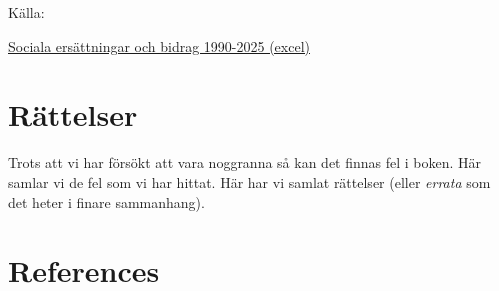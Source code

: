 \documentclass[
  letterpaper,
  DIV=11,
  numbers=noendperiod]{scrreprt}
\begin{document}
Källa:

\href{https://www.scb.se/hitta-statistik/statistik-efter-amne/hushallens-ekonomi/hushallens-inkomster-tillgangar-och-skulder/antalet-helarspersoner-som-forsorjdes-med-sociala-ersattningar-och-bidrag/pong/tabell-och-diagram/helarsekvivalenter/helarsekvivalenter-1990-2025/}{Sociala
ersättningar och bidrag 1990-2025 (excel)}


\chapter{Rättelser}\label{ruxe4ttelser}

Trots att vi har försökt att vara noggranna så kan det finnas fel i
boken. Här samlar vi de fel som vi har hittat. Här har vi samlat
rättelser (eller \emph{errata} som det heter i finare sammanhang).


\chapter*{References}\label{references}


\protect{}\label{refs}
\end{document}
